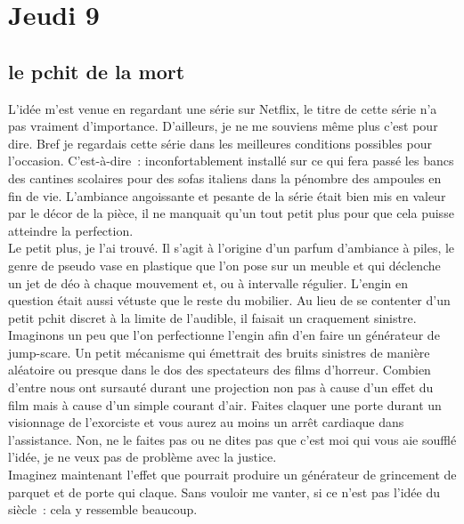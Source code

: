 ﻿\section*{Jeudi 9}
\subsection*{le pchit de la mort}
L’idée m’est venue en regardant une série sur Netflix, le titre de cette série n’a pas vraiment d’importance. D’ailleurs, je ne me souviens même plus c’est pour dire. Bref je regardais cette série dans les meilleures conditions possibles pour l’occasion. C’est-à-dire : inconfortablement installé sur ce qui fera passé les bancs des cantines scolaires pour des sofas italiens dans la pénombre des ampoules en fin de vie. L’ambiance angoissante et pesante de la série était bien mis en valeur par le décor de la pièce, il ne manquait qu’un tout petit plus pour que cela puisse atteindre la perfection.\\
Le petit plus, je l’ai trouvé. Il s’agit à l’origine d’un parfum d’ambiance à piles, le genre de pseudo vase en plastique que l’on pose sur un meuble et qui déclenche un jet de déo à chaque mouvement et, ou à intervalle régulier. L’engin en question était aussi vétuste que le reste du mobilier. Au lieu de se contenter d’un petit pchit discret à la limite de l’audible, il faisait un craquement sinistre. Imaginons un peu que l’on perfectionne l’engin afin d’en faire un générateur de jump-scare. Un petit mécanisme qui émettrait des bruits sinistres de manière aléatoire ou presque dans le dos des spectateurs des films d’horreur. Combien d’entre nous ont sursauté durant une projection non pas à cause d’un effet du film mais à cause d’un simple courant d’air. Faites claquer une porte durant un visionnage de l’exorciste et vous aurez au moins un arrêt cardiaque dans l’assistance. Non, ne le faites pas ou ne dites pas que c’est moi qui vous aie soufflé l’idée, je ne veux pas de problème avec la justice.\\
Imaginez maintenant l’effet que pourrait produire un générateur de grincement de parquet et de porte qui claque. Sans vouloir me vanter, si ce n’est pas l’idée du siècle : cela y ressemble beaucoup.

